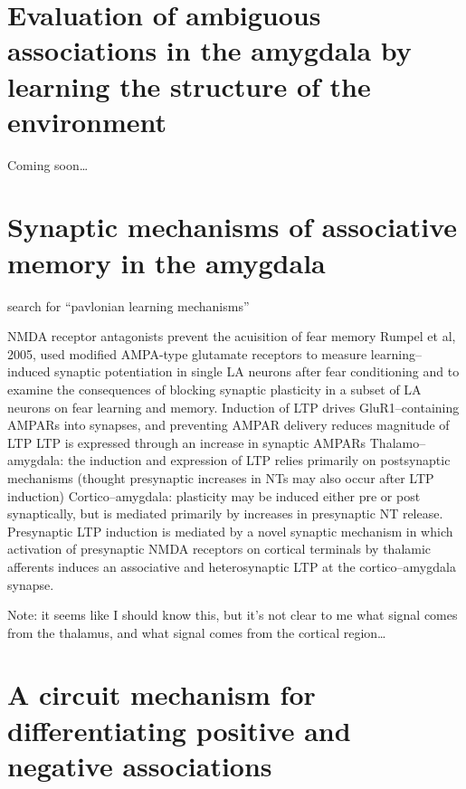 \documentclass[11pt, a4paper, oneside]{article}   	%
\begin{document}
\section{Evaluation of ambiguous associations in the amygdala by learning the structure of the environment \cite{Madarasz2016}}

Coming soon\ldots

\section{Synaptic mechanisms of associative memory in the amygdala \cite{Maren2005}}

search for ``pavlonian learning mechanisms''

\begin{outline}
    \point NMDA receptor antagonists prevent the acuisition of fear memory
    \point Rumpel et al, 2005, used modified AMPA-type glutamate receptors to measure learning--induced synaptic potentiation in single LA neurons after fear conditioning and to examine the consequences of blocking synaptic plasticity in a subset of LA neurons on fear learning and memory.
        \subpoint Induction of LTP drives GluR1--containing AMPARs into synapses, and preventing AMPAR delivery reduces magnitude of LTP
    \point LTP is expressed through an increase in synaptic AMPARs
    \point Thalamo--amygdala: the induction and expression of LTP relies primarily on postsynaptic mechanisms (thought presynaptic increases in NTs may also occur after LTP induction)
    \point Cortico--amygdala: plasticity may be induced either pre or post synaptically, but is mediated primarily by increases in presynaptic NT release.
        \subpoint Presynaptic LTP induction is mediated by a novel synaptic mechanism in which activation of presynaptic NMDA receptors on cortical terminals by thalamic afferents induces an associative and heterosynaptic LTP at the cortico--amygdala synapse.
\end{outline}

Note: it seems like I should know this, but it's not clear to me what signal comes from the thalamus, and what signal comes from the cortical region\ldots

\section{A circuit mechanism for differentiating positive and negative associations \cite{Namburi2015}}
\end{document}
